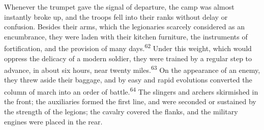 Whenever the trumpet gave the signal of departure, the camp was
almost instantly broke up, and the troops fell into their ranks
without delay or confusion. Besides their arms, which the
legionaries scarcely considered as an encumbrance, they were
laden with their kitchen furniture, the instruments of
fortification, and the provision of many days.\textsuperscript{62} Under this
weight, which would oppress the delicacy of a modern soldier,
they were trained by a regular step to advance, in about six
hours, near twenty miles.\textsuperscript{63} On the appearance of an enemy, they
threw aside their baggage, and by easy and rapid evolutions
converted the column of march into an order of battle.\textsuperscript{64} The
slingers and archers skirmished in the front; the auxiliaries
formed the first line, and were seconded or sustained by the
strength of the legions; the cavalry covered the flanks, and the
military engines were placed in the rear.





